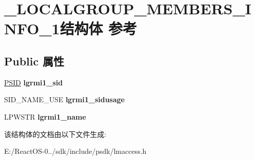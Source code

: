 \hypertarget{struct___l_o_c_a_l_g_r_o_u_p___m_e_m_b_e_r_s___i_n_f_o__1}{}\section{\+\_\+\+L\+O\+C\+A\+L\+G\+R\+O\+U\+P\+\_\+\+M\+E\+M\+B\+E\+R\+S\+\_\+\+I\+N\+F\+O\+\_\+1结构体 参考}
\label{struct___l_o_c_a_l_g_r_o_u_p___m_e_m_b_e_r_s___i_n_f_o__1}
\subsection*{Public 属性}
\begin{DoxyCompactItemize}
\item 
\mbox{\label{struct___l_o_c_a_l_g_r_o_u_p___m_e_m_b_e_r_s___i_n_f_o__1_aa9c7125980d17afe9848cb635f74a5e9}} 
\hyperlink{struct___s_i_d}{P\+S\+ID} {\bfseries lgrmi1\+\_\+sid}
\item 
\mbox{\label{struct___l_o_c_a_l_g_r_o_u_p___m_e_m_b_e_r_s___i_n_f_o__1_a485d417059654bc70b88070ad8fdf8c6}} 
S\+I\+D\+\_\+\+N\+A\+M\+E\+\_\+\+U\+SE {\bfseries lgrmi1\+\_\+sidusage}
\item 
\mbox{\label{struct___l_o_c_a_l_g_r_o_u_p___m_e_m_b_e_r_s___i_n_f_o__1_a501d63ae83999c82b6a8059bcf1c4e14}} 
L\+P\+W\+S\+TR {\bfseries lgrmi1\+\_\+name}
\end{DoxyCompactItemize}


该结构体的文档由以下文件生成\+:\begin{DoxyCompactItemize}
\item 
E\+:/\+React\+O\+S-\/0../sdk/include/psdk/lmaccess.\+h\end{DoxyCompactItemize}
